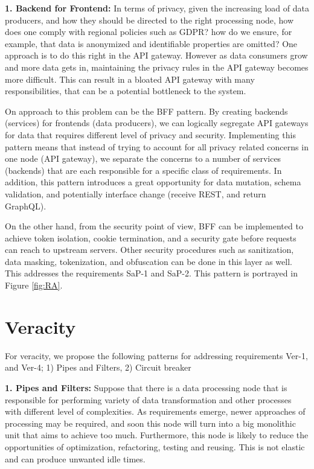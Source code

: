 \documentclass[a4paper,11pt,article,oneside]{memoir}
\begin{document}
\vspace{6px}
\textbf{1. Backend for Frontend:} In terms of privacy, given the increasing load of data producers, and how they should be directed to the right processing node, how does one comply with regional policies such as GDPR? how do we ensure, for example, that data is anonymized and identifiable properties are omitted? One approach is to do this right in the API gateway. However as data consumers grow and more data gets in, maintaining the privacy rules in the API gateway becomes more difficult. This can result in a bloated API gateway with many responsibilities, that can be a potential bottleneck to the system.

On approach to this problem can be the BFF pattern. By creating backends (services) for frontends (data producers), we can logically segregate API gateways for data that requires different level of privacy and security. Implementing this pattern means that instead of trying to account for all privacy related concerns in one node (API gateway), we separate the concerns to a number of services (backends) that are each responsible for a specific class of requirements. In addition, this pattern introduces a great opportunity for data mutation, schema validation, and potentially interface change (receive REST, and return GraphQL).

On the other hand, from the security point of view, BFF can be implemented to achieve token isolation, cookie termination, and a security gate before requests can reach to upstream servers. Other security procedures such as sanitization, data masking, tokenization, and obfuscation can be done in this layer as well. This addresses the requirements SaP-1 and SaP-2. This pattern is portrayed in Figure \ref{fig:RA}.


\section{Veracity}

For veracity, we propose the following patterns for addressing requirements Ver-1, and Ver-4; 1) Pipes and Filters, 2) Circuit breaker 

\vspace{6px}
\textbf{1. Pipes and Filters:} Suppose that there is a data processing node that is responsible for performing variety of data transformation and other processes with different level of complexities. As requirements emerge, newer approaches of processing may be required, and soon this node will turn into a big monolithic unit that aims to achieve too much. Furthermore, this node is likely to reduce the opportunities of optimization, refactoring, testing and reusing. This is not elastic and can produce unwanted idle times. 
\end{document}
